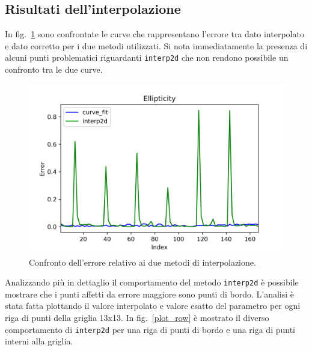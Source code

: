 \documentclass[12pt,a4paper,final]{book}
\begin{document}
\subsection{Risultati dell'interpolazione}\label{risultati_interpolazione}
In fig.~\ref{err_int} sono confrontate le curve che rappresentano l'errore tra dato interpolato e dato corretto per i due metodi utilizzati. Si nota immediatamente la presenza di alcuni punti problematici riguardanti \texttt{interp2d} che non rendono possibile un confronto tra le due curve.
\begin{figure}[!ht]
	\centering
	\includegraphics[scale=0.8]{../figures/error_comparison_all.png}
	\caption{Confronto dell'errore relativo ai due metodi di interpolazione.}
	\label{err_int}
\end{figure}

Analizzando più in dettaglio il comportamento del metodo \texttt{interp2d} è possibile mostrare che i punti affetti da errore maggiore sono punti di bordo. L'analisi è stata fatta plottando il valore interpolato e valore esatto del parametro per ogni riga di punti della griglia 13x13.
In fig.~\ref{plot_row} è mostrato il diverso comportamento di \texttt{interp2d} per una riga di punti di bordo e una riga di punti interni alla griglia.
\end{document}
